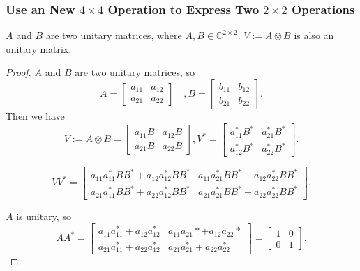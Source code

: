 \subsubsection{Use an New $4\times4$ Operation to Express Two $2\times2$ Operations}
\begin{property}\label{property_2}
    $A$ and $B$ are two unitary matrices, where $A, B\in \mathbb{C}^{2\times2}$. $V:=A\otimes B$ is also an unitary matrix. 
\end{property}
\begin{proof}
$A$ and $B$ are two unitary matrices, so
\begin{equation}
    A=\left[\begin{array}{ll}
    a_{11} & a_{12} \\
    a_{21} & a_{22}
    \end{array}\right] \quad, B=\left[\begin{array}{ll}
    b_{11} & b_{12} \\
    b_{21} & b_{22}
    \end{array}\right].
\end{equation}
Then we have 
\begin{equation}
    V:=A \otimes B=\left[\begin{array}{ll}
a_{11} B & a_{12} B \\
a_{21} B & a_{22} B
\end{array}\right], 
V^*=\left[\begin{array}{ll}
a_{11}^* B^* & a_{21}^* B^* \\
a_{12}^* B^* & a_{22}^* B^*
\end{array}\right].
\end{equation}

\begin{equation}
    V V^*=\left[\begin{array}{ll}
a_{11} a_{11}^* B B^*+a_{12} a_{12}^* B B^* & a_{11} a_{21}^* B B^*+a_{12} a_{22}^* B B^* \\
a_{21} a_{11}^* B B^*+a_{22} a_{12}^* B B^* & a_{21} a_{21}^* B B^*+a_{22} a_{22}^* B B^*
\end{array}\right].
\end{equation}


$A$ is unitary, so
\begin{equation}
    A A^*=\left[\begin{array}{ll}
a_{11} a_{11}^*+a_{12} a_{12}^* & a_{11} a_{21} *+a_{12} a_{22} * \\
a_{21} a_{11}^*+a_{22} a_{12}^* & a_{21} a_{21}^*+a_{22} a_{22}^*
\end{array}\right]=\left[\begin{array}{ll}
1 & 0 \\
0 & 1
\end{array}\right].
\end{equation}


\end{proof}
